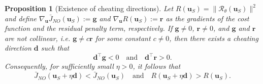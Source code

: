 \documentclass[10pt,a4paper]{amsart}
\newtheorem{proposition}{Proposition}
\begin{document}
\begin{proposition}[Existence of cheating directions]\label{prop:cheating_directions}
Let $R(\mathbf{u}_S)=\|\mathcal{R}_\theta(\mathbf{u}_S)\|^2$ and define $\nabla_\mathbf{u}\bar{J}_{NO}(\mathbf{u}_S):=\mathbf{g}$ and $\nabla_\mathbf{u}R(\mathbf{u}_S):=\mathbf{r}$ as the gradients of the cost function and the residual penalty term, respectively. If $\mathbf{g}\neq0$, $\mathbf{r}\neq0$, and $\mathbf{g}$ and $\mathbf{r}$ are not collinear, i.e. $\mathbf{g}\neq c\mathbf{r}$ for some constant $c\neq0$, then there exists a cheating direction $\mathbf{d}$ such that
\begin{equation}\label{eq:cheating_direction}
\mathbf{d}^\top \mathbf{g}<0 \quad \text{and}\quad \mathbf{d}^\top \mathbf{r}>0.
\end{equation}
Consequently, for sufficiently small $\eta>0$, it follows that
\begin{equation}\label{eq:cheating_direction_step}
\bar{J}_{NO}(\mathbf{u}_S+\eta \mathbf{d})<\bar{J}_{NO}(\mathbf{u}_S) \quad \text{and}\quad R(\mathbf{u}_S+\eta \mathbf{d})>R(\mathbf{u}_S).
\end{equation}
\end{proposition}
\end{document}
